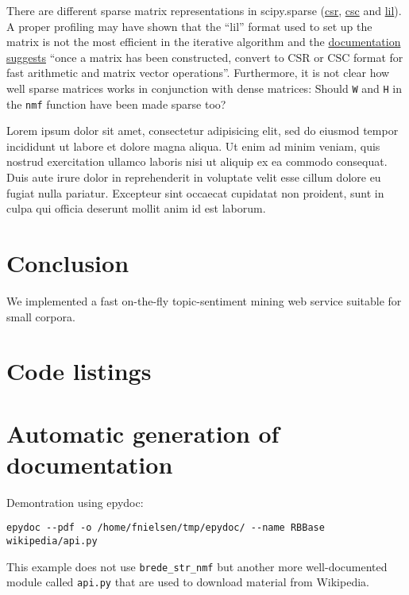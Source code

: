 \documentclass[10pt]{IEEEtran}
\begin{document}
There are different sparse matrix representations in scipy.sparse
(\href{http://docs.scipy.org/doc/scipy/reference/generated/scipy.sparse.csr_matrix.html}{csr}, 
\href{http://docs.scipy.org/doc/scipy/reference/generated/scipy.sparse.csc_matrix.html}{csc}
and 
\href{http://docs.scipy.org/doc/scipy/reference/generated/scipy.sparse.lil_matrix.html}{lil}). 
A proper profiling may have shown that the ``lil'' format used to set up
the matrix is not the most efficient in the iterative algorithm and
the
\href{http://docs.scipy.org/doc/scipy/reference/generated/scipy.sparse.lil_matrix.html}{documentation
  suggests} ``once a matrix has been constructed, convert to CSR or
CSC format for fast arithmetic and matrix vector operations''.
Furthermore, it is not clear how well sparse matrices works in
conjunction with dense matrices: Should {\tt W} and {\tt H} in the
{\tt nmf} function have been made sparse too?

Lorem ipsum dolor sit amet, consectetur adipisicing elit, sed do
eiusmod tempor incididunt ut labore et dolore magna aliqua. Ut enim ad
minim veniam, quis nostrud exercitation ullamco laboris nisi ut
aliquip ex ea commodo consequat. Duis aute irure dolor in
reprehenderit in voluptate velit esse cillum dolore eu fugiat nulla
pariatur. Excepteur sint occaecat cupidatat non proident, sunt in
culpa qui officia deserunt mollit anim id est laborum.


\section{Conclusion}

We implemented a fast on-the-fly topic-sentiment mining web service suitable
for small corpora.






\clearpage
\onecolumn
\appendices
\section{Code listings}

\lstlistoflistings


\label{listing:brede_str_nmf}


\newpage
\section{Automatic generation of documentation}

Demontration using epydoc:
\begin{verbatim}
epydoc --pdf -o /home/fnielsen/tmp/epydoc/ --name RBBase wikipedia/api.py
\end{verbatim}
This example does not use \verb!brede_str_nmf! but another more
well-documented module called {\tt api.py} that are used to download
material from Wikipedia. 


\end{document}
